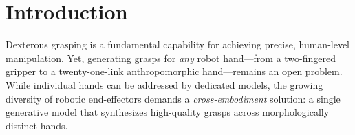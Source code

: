 
\section{Introduction}
\label{sec:intro}

Dexterous grasping is a fundamental capability for achieving precise, human-level manipulation.
Yet, generating grasps for \emph{any} robot hand---from a two-fingered gripper to a twenty-one-link anthropomorphic hand---remains an open problem.
While individual hands can be addressed by dedicated models, the growing diversity of robotic end-effectors demands a \emph{cross-embodiment} solution: a single generative model that synthesizes high-quality grasps across morphologically distinct hands.

